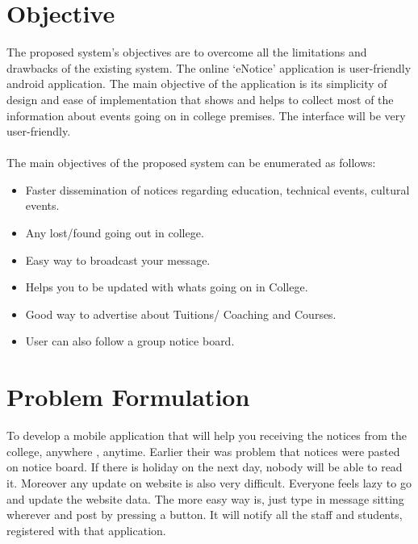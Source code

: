 \pagebreak
\section{Objective}

The proposed system's objectives are to overcome all the limitations and drawbacks of the
existing system. The online ‘eNotice’ application is user-friendly android application. The main
objective of the application is its simplicity of design and ease of implementation that shows and
helps to collect most of the information about events going on in college premises. The interface
will be very user-friendly. \\ \\
The main objectives of the proposed system can be enumerated as follows:
\begin{itemize}
\item Faster dissemination of notices regarding education, technical events, cultural events.
\item Any lost/found going out in college.
\item Easy way to broadcast your message.
\item Helps you to be updated with whats going on in College.
\item Good way to advertise about Tuitions/ Coaching and Courses.
\item User can also follow a group notice board.
\end{itemize}

\pagebreak
\section{Problem Formulation}

To develop a mobile application that will help you receiving the notices from the college, anywhere , anytime. Earlier their was problem that notices were pasted on notice board. If there is holiday on the next day, nobody will be able to read it. Moreover any update on website is also very difficult. Everyone feels lazy to go and update the website data. The more easy way is, just type in message sitting wherever and post by pressing a button. It will notify all the staff and students, registered with that application. \\

